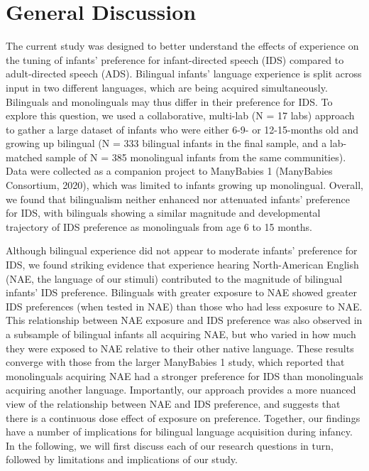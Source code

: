 \documentclass[
  english,
  ,man,floatsintext]{apa6}
\begin{document}
\hypertarget{general-discussion}{%
\section{General Discussion}\label{general-discussion}}

The current study was designed to better understand the effects of experience on the tuning of infants' preference for infant-directed speech (IDS) compared to adult-directed speech (ADS). Bilingual infants' language experience is split across input in two different languages, which are being acquired simultaneously. Bilinguals and monolinguals may thus differ in their preference for IDS. To explore this question, we used a collaborative, multi-lab (N = 17 labs) approach to gather a large dataset of infants who were either 6-9- or 12-15-months old and growing up bilingual (N = 333 bilingual infants in the final sample, and a lab-matched sample of N = 385 monolingual infants from the same communities). Data were collected as a companion project to ManyBabies 1 (ManyBabies Consortium, 2020), which was limited to infants growing up monolingual. Overall, we found that bilingualism neither enhanced nor attenuated infants' preference for IDS, with bilinguals showing a similar magnitude and developmental trajectory of IDS preference as monolinguals from age 6 to 15 months.

Although bilingual experience did not appear to moderate infants' preference for IDS, we found striking evidence that experience hearing North-American English (NAE, the language of our stimuli) contributed to the magnitude of bilingual infants' IDS preference. Bilinguals with greater exposure to NAE showed greater IDS preferences (when tested in NAE) than those who had less exposure to NAE. This relationship between NAE exposure and IDS preference was also observed in a subsample of bilingual infants all acquiring NAE, but who varied in how much they were exposed to NAE relative to their other native language. These results converge with those from the larger ManyBabies 1 study, which reported that monolinguals acquiring NAE had a stronger preference for IDS than monolinguals acquiring another language. Importantly, our approach provides a more nuanced view of the relationship between NAE and IDS preference, and suggests that there is a continuous dose effect of exposure on preference. Together, our findings have a number of implications for bilingual language acquisition during infancy. In the following, we will first discuss each of our research questions in turn, followed by limitations and implications of our study.
\end{document}
